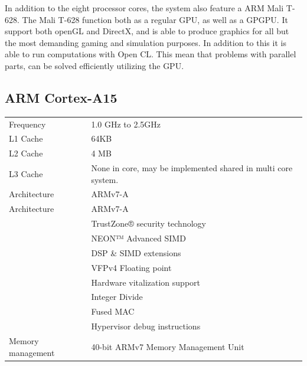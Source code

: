 In addition to the eight processor cores, the system also feature a ARM Mali T-628.
The Mali T-628 function both as a regular GPU, as well as a GPGPU.
It support both openGL and DirectX, and is able to produce graphics for all but the most demanding gaming and simulation purposes.
In addition to this it is able to run computations with Open CL.
This mean that problems with parallel parts, can be solved efficiently utilizing the GPU.

\subsection{ARM Cortex-A15}
\begin{table}[H]
  \begin{tabular}{ll}
    Frequency         & 1.0 GHz to 2.5GHz  \\
    L1 Cache          & 64KB \\
    L2 Cache          & 4 MB \\
    L3 Cache          & None in core, may be implemented shared in multi core system. \\Architecture      & ARMv7-A            \\
    Architecture      & ARMv7-A            \\
                      & TrustZone® security technology \\
                      & NEON™ Advanced SIMD \\
                      & DSP \& SIMD extensions \\
                      & VFPv4 Floating point \\
                      & Hardware vitalization support \\
                      & Integer Divide \\
                      & Fused MAC \\
                      & Hypervisor debug instructions \\
    Memory management & 40-bit ARMv7 Memory Management Unit
  \end{tabular}
\end{table}
